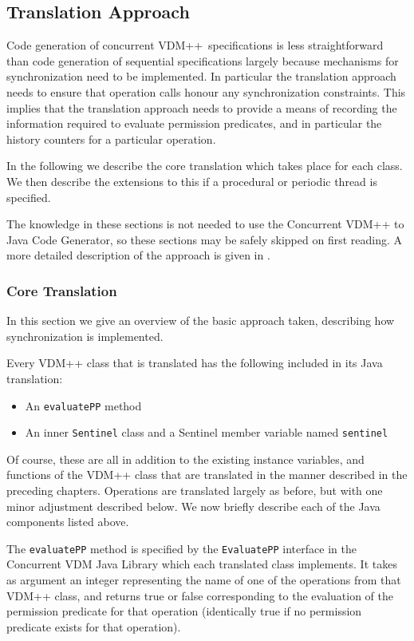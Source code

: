 \documentclass[\pformat,11pt]{article}
\newcommand{\VDM}{VDM++}
\newcommand{\cg}{VDM++ to Java Code Generator}
\newcommand{\ccg}{Concurrent \cg}
\newcommand{\CJL}{Concurrent VDM Java Library}
\begin{document}
\subsection{Translation Approach}
Code generation of concurrent \VDM\ specifications is less
straightforward than code generation of sequential specifications
largely because mechanisms for synchronization need to be
implemented. In particular the translation approach needs to ensure
that operation calls honour any synchronization constraints. This
implies that the translation approach needs to provide a means of
recording the information required to evaluate permission predicates,
and in particular the history counters for a particular operation.

In the following we describe the core translation which takes place
for each class. We then describe the extensions to this if a
procedural or periodic thread is specified.

The knowledge in these sections is not needed to use
the \ccg, so these sections may be safely skipped on first reading. A
more detailed description of the approach is given in \cite{Oppitz99-CSK}.

\subsubsection{Core Translation}

In this section we give an overview of the basic approach taken, describing
how synchronization is implemented. 

Every VDM++ class that is translated has the following included in its
Java translation:
\begin{itemize}
\item An \texttt{evaluatePP} method
\item An inner \texttt{Sentinel} class and a Sentinel member variable
  named \texttt{sentinel}
\end{itemize}
Of course, these are all in addition to the existing instance variables,
and functions of the VDM++ class that are translated in
the manner described in the preceding chapters. Operations are
translated largely as before, but with one minor adjustment described
below. We now briefly describe each of the Java components listed
above.

The \texttt{evaluatePP} method is specified by the \texttt{EvaluatePP}
interface in the \CJL{} which each translated class implements. It
takes as argument an integer representing the name of one of the
operations from that VDM++ class, and returns true or false
corresponding to the evaluation of the permission predicate for that
operation (identically true if no permission predicate exists for that
operation). 
\end{document}
